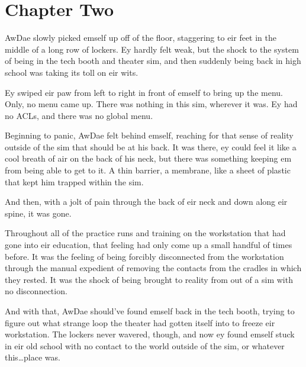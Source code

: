 \chapter*{Chapter Two}

AwDae slowly picked emself up off of the floor, staggering to eir feet in the middle of a long row of lockers.  Ey hardly felt weak, but the shock to the system of being in the tech booth and theater sim, and then suddenly being back in high school was taking its toll on eir wits.

Ey swiped eir paw from left to right in front of emself to bring up the menu.  Only, no menu came up.  There was nothing in this sim, wherever it was.  Ey had no ACLs, and there was no global menu.

Beginning to panic, AwDae felt behind emself, reaching for that sense of reality outside of the sim that should be at his back.  It was there, ey could feel it like a cool breath of air on the back of his neck, but there was something keeping em from being able to get to it.  A thin barrier, a membrane, like a sheet of plastic that kept him trapped within the sim.

And then, with a jolt of pain through the back of eir neck and down along eir spine, it was gone.

Throughout all of the practice runs and training on the workstation that had gone into eir education, that feeling had only come up a small handful of times before.  It was the feeling of being forcibly disconnected from the workstation through the manual expedient of removing the contacts from the cradles in which they rested.  It was the shock of being brought to reality from out of a sim with no disconnection.

And with that, AwDae should've found emself back in the tech booth, trying to figure out what strange loop the theater had gotten itself into to freeze eir workstation.  The lockers never wavered, though, and now ey found emself stuck in eir old school with no contact to the world outside of the sim, or whatever this\ldots{}place was.
